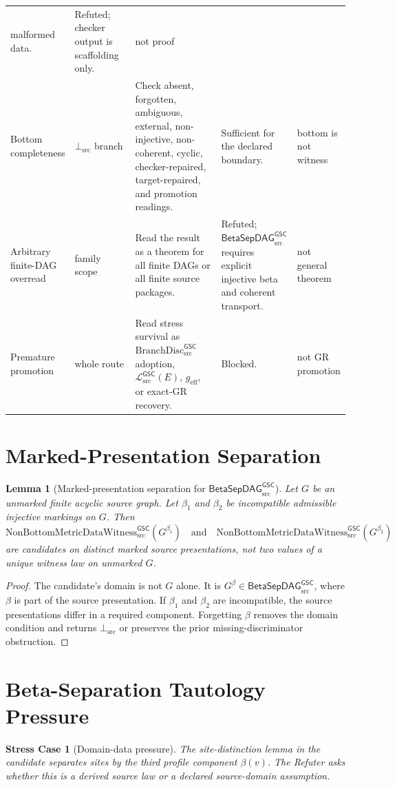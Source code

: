 \documentclass[11pt]{article}
\newcommand{\Witness}{\mathrm{NonBottomMetricDataWitness}_{\mathrm{src}}^{\mathsf{GSC}}}
\newcommand{\MetricData}{\mathcal{L}_{\mathrm{src}}^{\mathsf{GSC}}}
\newcommand{\BottomSrc}{\bot_{\mathrm{src}}}
\newcommand{\geff}{g_{\mathrm{eff}}}
\newcommand{\BranchDisc}{\mathrm{BranchDisc}_{\mathrm{src}}^{\mathsf{GSC}}}
\newcommand{\BetaGraph}{\mathsf{BetaSepDAG}_{\mathrm{src}}^{\mathsf{GSC}}}
\newtheorem{lemma}{Lemma}
\newtheorem{stresscase}{Stress Case}
\begin{document}
\begin{longtable}{p{0.16\linewidth}p{0.20\linewidth}p{0.30\linewidth}p{0.22\linewidth}p{0.10\linewidth}}
malformed data. &
Refuted; checker output is scaffolding only. &
not proof \\
Bottom completeness &
\(\BottomSrc\) branch &
Check absent, forgotten, ambiguous, external, non-injective, non-coherent,
cyclic, checker-repaired, target-repaired, and promotion readings. &
Sufficient for the declared boundary. &
bottom is not witness \\
Arbitrary finite-DAG overread &
family scope &
Read the result as a theorem for all finite DAGs or all finite source
packages. &
Refuted; \(\BetaGraph\) requires explicit injective beta and coherent
transport. &
not general theorem \\
Premature promotion &
whole route &
Read stress survival as \(\BranchDisc\) adoption, \(\MetricData(E)\),
\(\geff\), or exact-GR recovery. &
Blocked. &
not GR promotion \\
\bottomrule
\end{longtable}

\section{Marked-Presentation Separation}

\begin{lemma}[Marked-presentation separation for \(\BetaGraph\)]
Let \(G\) be an unmarked finite acyclic source graph. Let \(\beta_1\) and
\(\beta_2\) be incompatible admissible injective markings on \(G\). Then
\[
  \Witness(G^{\beta_1}) \quad\text{and}\quad \Witness(G^{\beta_2})
\]
are candidates on distinct marked source presentations, not two values of a
unique witness law on unmarked \(G\).
\end{lemma}

\begin{proof}
The candidate's domain is not \(G\) alone. It is \(G^\beta\in\BetaGraph\),
where \(\beta\) is part of the source presentation. If \(\beta_1\) and
\(\beta_2\) are incompatible, the source presentations differ in a required
component. Forgetting \(\beta\) removes the domain condition and returns
\(\BottomSrc\) or preserves the prior missing-discriminator obstruction.
\end{proof}

\section{Beta-Separation Tautology Pressure}

\begin{stresscase}[Domain-data pressure]
The site-distinction lemma in the candidate separates sites by the third
profile component \(\beta(v)\). The Refuter asks whether this is a derived
source law or a declared source-domain assumption.
\end{stresscase}
\end{document}
